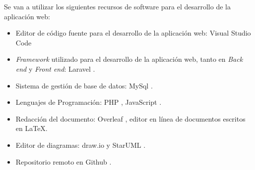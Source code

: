 Se van a utilizar los siguientes recursos de software para el desarrollo de la aplicación web: 
\begin{itemize}
    \item Editor de código fuente para el desarrollo de la aplicación web: Visual Studio Code \cite{visualStudioCode}
    \item \textit{Framework} utilizado para el desarrollo de la aplicación web, tanto en \textit{Back end} y \textit{Front end}: Laravel \cite{laravel}.
    \item Sistema de gestión de base de datos: MySql \cite{mysql}.
    \item Lenguajes de Programación: PHP \cite{PHP}, JavaScript \cite{javascript}.
    \item Redacción del documento: Overleaf \cite{overleaf}, editor en línea de documentos escritos en \LaTeX. 
    \item Editor de diagramas: draw.io \cite{drawio} y StarUML \cite{starUML}.
    \item Repositorio remoto en Github \cite{github}.
\end{itemize}


